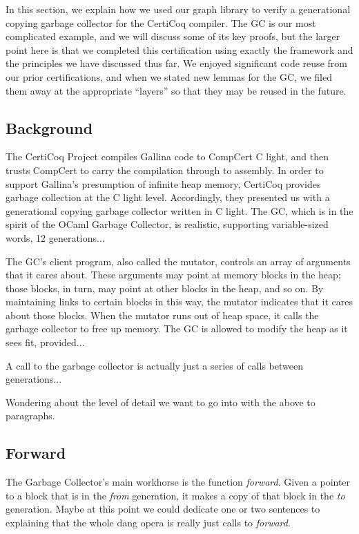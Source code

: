 In this section, we explain how we used our graph library
to verify a generational copying garbage collector for the 
CertiCoq compiler. The GC is our most complicated example,
and we will discuss some of its key proofs, but the larger
point here is that we completed this certification using 
exactly the framework and the principles we have discussed
thus far. {\color{magenta}We enjoyed significant code 
reuse from our prior certifications, and when we stated 
new lemmas for the GC, we filed them away at the appropriate
``layers'' so that they may be reused in the future.}

\subsection{Background}
\label{sec:gcbackground}
The CertiCoq Project compiles Gallina code to CompCert 
C light, and then trusts CompCert to carry the compilation 
through to assembly. In order to support Gallina's presumption of
infinite heap memory, CertiCoq provides garbage collection at
the C light level. Accordingly, they presented us with a 
generational copying garbage collector written in C light. 
The GC, which is in the spirit of the OCaml Garbage Collector,
is realistic, supporting variable-sized words, 12 generations... 

The GC's client program, also called the mutator, controls
an array of arguments that it cares about. These arguments may
point at memory blocks in the heap; those blocks, in turn, 
may point at other blocks in the heap, and so on. By 
maintaining links to certain blocks in this way, the mutator 
indicates that it cares about those blocks. When the mutator
runs out of heap space, it calls the garbage collector 
to free up memory. The GC is allowed to modify the heap as
it sees fit, provided... 

A call to the garbage collector is actually just a series of 
calls between generations...

{\color{blue}Wondering about the level of detail we want to go
into with the above to paragraphs.}

\subsection{Forward}
\label{sec:gcforward}
The Garbage Collector's main workhorse is the function \emph{forward}.
Given a pointer to a block that is in the \emph{from} generation, 
it makes a copy of that block in the \emph{to} generation.
{\color{blue}Maybe at this point we could dedicate one or 
two sentences to explaining that the whole dang opera is really just 
calls to \emph{forward}.}


